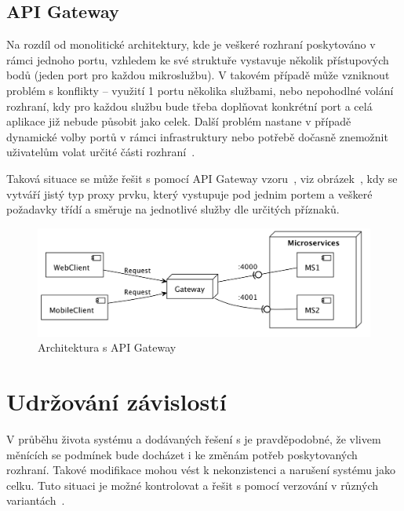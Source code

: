 \subsection{API Gateway}\label{subsec:api-gateway}

Na rozdíl od monolitické architektury, kde je veškeré rozhraní poskytováno v rámci jednoho portu,  vzhledem ke své struktuře vystavuje několik přístupových bodů (jeden port pro každou mikroslužbu).
V takovém případě může vzniknout problém s konflikty – využití 1 portu několika službami, nebo nepohodlné volání rozhraní, kdy pro každou službu bude třeba doplňovat konkrétní port a celá aplikace již nebude působit jako celek.
Další problém nastane v případě dynamické volby portů v rámci infrastruktury nebo potřebě dočasně znemožnit uživatelům volat určité části rozhraní~\cite{gateway}.

Taková situace se může řešit s pomocí API Gateway vzoru~\cite{gateway}, viz obrázek~, kdy se vytváří jistý typ proxy prvku, který vystupuje pod jednim portem a veškeré požadavky třídí a směruje na jednotlivé služby dle určitých příznaků.


\begin{figure}[htbp]
   \centering
   \includegraphics[max width=\textwidth]{assets/gateway}
   \caption{Architektura s API Gateway}\label{fig:msa-gateway}
\end{figure}



\section{Udržování závislostí}\label{sec:msa-dependencies}

V průběhu života systému a dodávaných řešení s  je pravděpodobné, že vlivem měnících se podmínek bude docházet i ke změnám potřeb poskytovaných rozhraní.
Takové modifikace mohou vést k nekonzistenci a narušení systému jako celku.
Tuto situaci je možné kontrolovat a řešit s pomocí verzování v různých variantách~\cite{msversions}.



